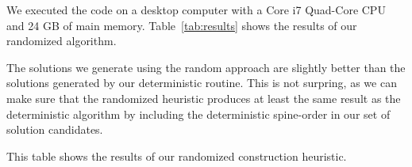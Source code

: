 \documentclass{scrartcl}
\begin{document}
We executed the code on a desktop computer with a Core i7 Quad-Core
CPU and 24 GB of main memory. Table~\ref{tab:results} shows the
results of our randomized algorithm.


The solutions we generate using the random approach are
slightly better than the solutions generated by our deterministic
routine. This is not surpring, as we can make sure that the randomized
heuristic produces at least the same result as the deterministic
algorithm by including the deterministic spine-order in our set of
solution candidates.




\begin{table}[h]

\centering

\caption{This table shows the results of our randomized construction heuristic.}
\label{tab:results}
\end{table}
\end{document}
